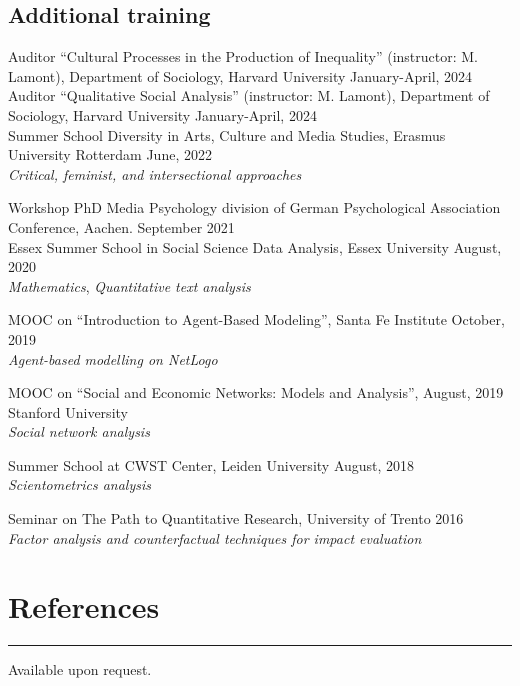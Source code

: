 \documentclass[12pt,]{article}
\begin{document}
\hypertarget{additional-training}{%
\subsection{Additional training}\label{additional-training}}

Auditor ``Cultural Processes in the Production of Inequality''
(instructor: M. Lamont), Department of Sociology, Harvard University
\hfill \begingroup\small January-April, 2024\endgroup\\

Auditor ``Qualitative Social Analysis'' (instructor: M. Lamont),
Department of Sociology, Harvard University
\hfill \begingroup\small January-April, 2024\endgroup\\

Summer School Diversity in Arts, Culture and Media Studies, Erasmus
University Rotterdam \hfill \begingroup\small June, 2022\endgroup\\
\emph{Critical, feminist, and intersectional approaches}

Workshop PhD Media Psychology division of German Psychological
Association Conference, Aachen. \hfill \begingroup\small September
2021\endgroup\\

Essex Summer School in Social Science Data Analysis, Essex University
\hfill \begingroup\small August, 2020\endgroup\\
\emph{Mathematics}, \emph{Quantitative text analysis}

MOOC on ``Introduction to Agent-Based Modeling'', Santa Fe Institute
\hfill \begingroup\small October, 2019\endgroup\\
\emph{Agent-based modelling on NetLogo}

MOOC on ``Social and Economic Networks: Models and Analysis'',
\hfill \begingroup\small August, 2019\endgroup\\
Stanford University\\
\emph{Social network analysis}

Summer School at CWST Center, Leiden University
\hfill \begingroup\small August, 2018\endgroup\\
\emph{Scientometrics analysis}

Seminar on The Path to Quantitative Research, University of Trento
\hfill \begingroup\small 2016\endgroup\\
\emph{Factor analysis and counterfactual techniques for impact
evaluation} \newline

\hypertarget{references}{%
\section{References}\label{references}}

\vspace{-10pt}
\rule{1\linewidth}{\linethickness}

Available upon request.
\end{document}
